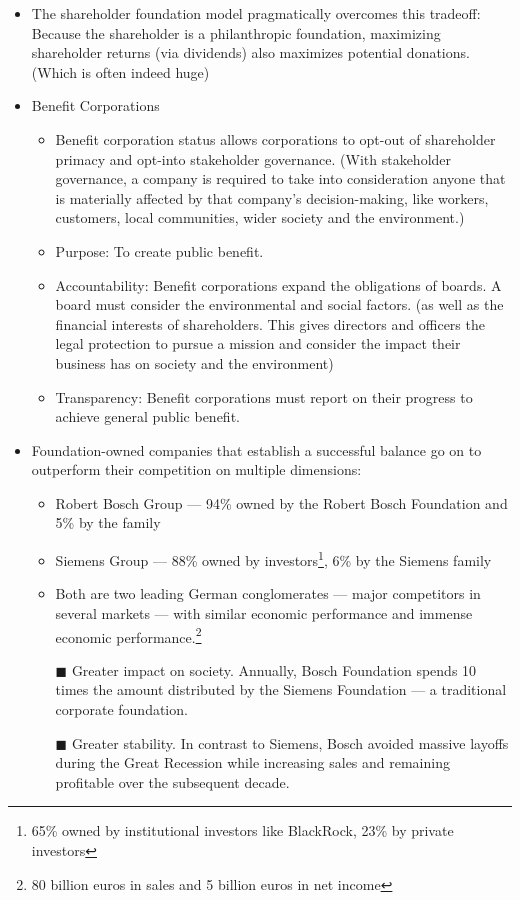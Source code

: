 \documentclass[oneside]{book}
\begin{document}
\begin{enumerate}
\begin{itemize}
\begin{itemize}
\begin{itemize}
            \end{itemize}
            \item The shareholder foundation model pragmatically overcomes this tradeoff: Because the shareholder is a philanthropic foundation, maximizing shareholder returns (via dividends) also maximizes potential donations. (Which is often indeed huge)
            \item Benefit Corporations
            \begin{itemize}
                \item Benefit corporation status allows corporations to opt-out of shareholder primacy and opt-into stakeholder governance. (With stakeholder governance, a company is required to take into consideration anyone that is materially affected by that company's decision-making, like workers, customers, local communities, wider society and the environment.)
                \item Purpose: To create public benefit. 
                \item Accountability: Benefit corporations expand the obligations of boards. A board must consider the environmental and social factors. (as well as the financial interests of shareholders. This gives directors and officers the legal protection to pursue a mission and consider the impact their business has on society and the environment)
                \item Transparency: Benefit corporations must report on their progress to achieve general public benefit.
            \end{itemize}
            \item Foundation-owned companies that establish a successful balance go on to outperform their competition on multiple dimensions: 
            \begin{itemize}
                \item Robert Bosch Group --- 94\% owned by the Robert Bosch Foundation and 5\% by the family
                \item Siemens Group --- 88\% owned by investors\footnote{65\% owned by institutional investors like BlackRock, 23\% by private investors}, 6\% by the Siemens family 
                \item Both are two leading German conglomerates --- major competitors in several markets --- with similar economic performance and immense economic performance.\footnote{80 billion euros in sales and 5 billion euros in net income}
                \item[\(\blacksquare\)] Greater impact on society. Annually, Bosch Foundation spends 10 times the amount distributed by the Siemens Foundation --- a traditional corporate foundation.
                \item[\(\blacksquare\)] Greater stability. In contrast to Siemens, Bosch avoided massive layoffs during the Great Recession while increasing sales and remaining profitable over the subsequent decade. 
            \end{itemize}
        \end{itemize}
    \end{itemize}
\end{enumerate}
\end{document}
